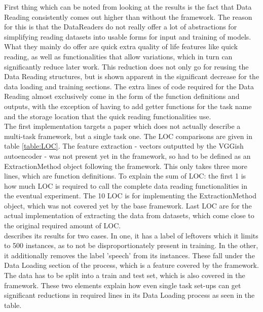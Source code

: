 First thing which can be noted from looking at the results is the fact that Data Reading consistently comes out higher than without the framework. The reason for this is that the DataReaders do not really offer a lot of abstractions for simplifying reading datasets into usable forms for input and training of models. What they mainly do offer are quick extra quality of life features like quick reading, as well as functionalities that allow variations, which in turn can significantly reduce later work. This reduction does not only go for reusing the Data Reading structures, but is shown apparent in the significant decrease for the data loading and training sections. The extra lines of code required for the Data Reading almost exclusively come in the form of the function definitions and outputs, with the exception of having to add getter functions for the task name and the storage location that the quick reading functionalities use. \\ 

\textbf{\citet{park2020augmenting}} The first implementation \cite{park2020augmenting} targets a paper which does not actually describe a multi-task framework, but a single task one. The LOC comparisons are given in table \ref{table:LOC}. The feature extraction - vectors outputted by the VGGish autoencoder - was not present yet in the framework, so had to be defined as an ExtractionMethod object following the framework. This only takes three more lines, which are function definitions. To explain the sum of LOC: the first 1 is how much LOC is required to call the complete data reading functionalities in the eventual experiment. The 10 LOC is for implementing the ExtractionMethod object, which was not covered yet by the base framework. Last LOC are for the actual implementation of extracting the data from datasets, which come close to the original required amount of LOC.\\

\citet{park2020augmenting} describes its results for two cases. In one, it has a label of leftovers which it limits to 500 instances, as to not be disproportionately present in training. In the other, it additionally removes the label 'speech' from its instances. These fall under the Data Loading section of the process, which is a feature covered by the framework. The data has to be split into a train and test set, which is also covered in the framework. These two elements explain how even single task set-ups can get significant reductions in required lines in its Data Loading process as seen in the table.  \\

